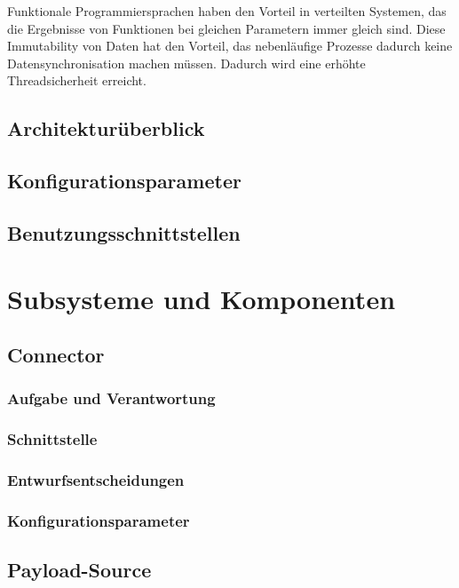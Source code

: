 \documentclass[draft=false
              ,paper=a4
              ,twoside=false
              ,fontsize=11pt
              ,headsepline
              ,BCOR10mm
              ,DIV11
              ]{scrbook}
\begin{document}
Funktionale Programmiersprachen haben den Vorteil in verteilten Systemen, das die Ergebnisse von Funktionen bei gleichen Parametern immer gleich sind. Diese Immutability von Daten hat den Vorteil, das nebenläufige Prozesse dadurch keine Datensynchronisation machen müssen. Dadurch wird eine erhöhte Threadsicherheit erreicht.

\section{Architekturüberblick}

\section{Konfigurationsparameter}

\section{Benutzungsschnittstellen}

\chapter{Subsysteme und Komponenten}

\section{Connector}

\subsection{Aufgabe und Verantwortung}

\subsection{Schnittstelle}

\subsection{Entwurfsentscheidungen}

\subsection{Konfigurationsparameter}

\section{Payload-Source}
\end{document}
